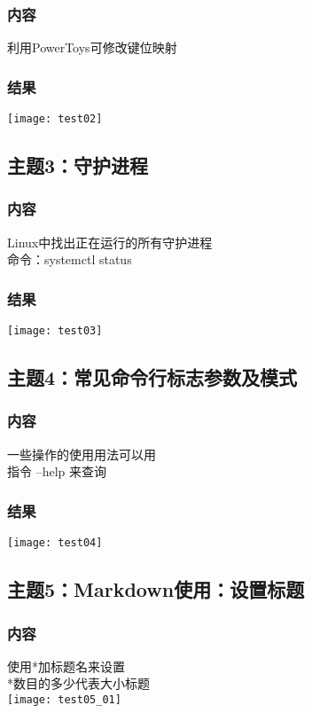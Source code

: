 \documentclass{article}
\begin{document}
\subsubsection{内容}
利用PowerToys可修改键位映射\\
\subsubsection{结果}  
\texttt{[image: test02]}\\
\vspace{1cm}
\subsection{主题3：守护进程}  
\subsubsection{内容}
Linux中找出正在运行的所有守护进程\\
命令：systemctl status\\
\subsubsection{结果}  
\texttt{[image: test03]}\\
\vspace{1cm}
\subsection{主题4：常见命令行标志参数及模式}  
\subsubsection{内容}
一些操作的使用用法可以用\\
指令 --help 来查询\\
\subsubsection{结果}
\texttt{[image: test04]}\\  
\vspace{1cm}
\subsection{主题5：Markdown使用：设置标题}  
\subsubsection{内容}
使用*加标题名来设置\\
*数目的多少代表大小标题\\
\texttt{[image: test05\_01]}\\  
\end{document}
